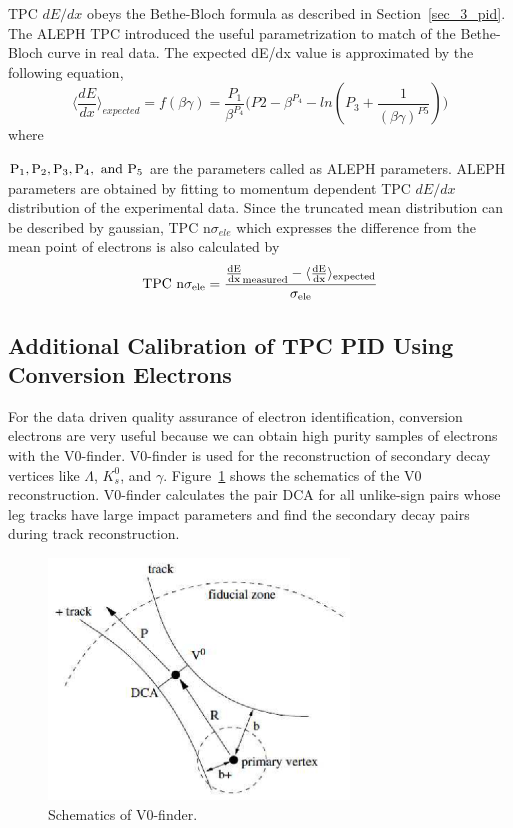 {TPC $dE/dx$ obeys the Bethe-Bloch formula as described in Section~\ref{sec_3_pid}. 
The ALEPH TPC introduced the useful parametrization to match of the Bethe-Bloch curve in real data. 
The expected dE/dx value is approximated by the following equation, 
\begin{equation}
  \langle \frac{dE}{dx} \rangle_{expected} = f(\beta \gamma) = \frac{P_{1}}{\beta^{P_{4}}}\big( P2-\beta^{P_{4}}-ln(P_{3}+\frac{1}{(\beta\gamma)^{P5}}) \bigr)
\end{equation}
where {$\rm{P_{1}, P_{2}, P_{3}, P_{4}, ~and~P_{5}}$ are the parameters called as ALEPH parameters. 
ALEPH parameters are obtained by fitting to momentum dependent TPC $dE/dx$ distribution of the experimental data.
Since the truncated mean distribution can be described by gaussian, TPC n$\sigma_{ele}$ which expresses the difference from the mean point of electrons is also calculated by 
\begin{equation}
  \rm{TPC~n}\sigma_{ele} = \frac{\frac{dE}{dx}_{measured} - \langle \frac{dE}{dx} \rangle_{expected} }{\sigma_{ele}}
\end{equation}

\subsection{Additional Calibration of TPC PID Using Conversion Electrons}
\label{sec_4_convpid}
For the data driven quality assurance of electron identification, conversion electrons are very useful because we can obtain high purity samples of electrons with the V0-finder.
V0-finder is used for the reconstruction of secondary decay vertices like $\Lambda$, $K^{0}_{s}$, and $\gamma$. 
Figure~\ref{fig_4_v0finder} shows the schematics of the V0 reconstruction. 
V0-finder calculates the pair DCA for all unlike-sign pairs whose leg tracks have large impact parameters and find the secondary decay pairs during track reconstruction. 
\begin{figure}[!h]
  \centering
  \includegraphics[width=8cm]{chap4/figure/PID/v0-finder.eps}
  \caption{Schematics of V0-finder. }
  \label{fig_4_v0finder}
\end{figure}

}}
